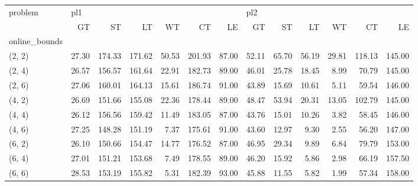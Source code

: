 \begin{tabular}{lrrrrrrrrrrrr}
\toprule
problem & \multicolumn{6}{l}{pl1} & \multicolumn{6}{l}{pl2} \\
{} &    GT &     ST &     LT &    WT &     CT &    LE &    GT &    ST &    LT &    WT &     CT &     LE \\
online\_bounds &       &        &        &       &        &       &       &       &       &       &        &        \\
\midrule
(2, 2)        & 27.30 & 174.33 & 171.62 & 50.53 & 201.93 & 87.00 & 52.11 & 65.70 & 56.19 & 29.81 & 118.13 & 145.00 \\
(2, 4)        & 26.57 & 156.57 & 161.64 & 22.91 & 182.73 & 89.00 & 46.01 & 25.78 & 18.45 &  8.99 &  70.79 & 145.00 \\
(2, 6)        & 27.06 & 160.01 & 164.13 & 15.61 & 186.74 & 91.00 & 43.89 & 15.69 & 10.61 &  5.11 &  59.54 & 146.00 \\
(4, 2)        & 26.69 & 151.66 & 155.08 & 22.36 & 178.44 & 89.00 & 48.47 & 53.94 & 20.31 & 13.05 & 102.79 & 145.00 \\
(4, 4)        & 26.12 & 156.56 & 159.42 & 11.49 & 183.05 & 87.00 & 43.76 & 15.01 & 10.26 &  3.82 &  58.45 & 146.00 \\
(4, 6)        & 27.25 & 148.28 & 151.19 &  7.37 & 175.61 & 91.00 & 43.60 & 12.97 &  9.30 &  2.55 &  56.20 & 147.00 \\
(6, 2)        & 26.10 & 150.66 & 154.47 & 14.77 & 176.52 & 87.00 & 46.95 & 29.34 &  9.89 &  6.84 &  79.79 & 153.00 \\
(6, 4)        & 27.01 & 151.21 & 153.68 &  7.49 & 178.55 & 89.00 & 46.20 & 15.92 &  5.86 &  2.98 &  66.19 & 157.50 \\
(6, 6)        & 28.53 & 153.19 & 155.82 &  5.31 & 182.39 & 93.00 & 45.88 & 11.55 &  5.82 &  1.99 &  57.34 & 158.00 \\
\bottomrule
\end{tabular}
